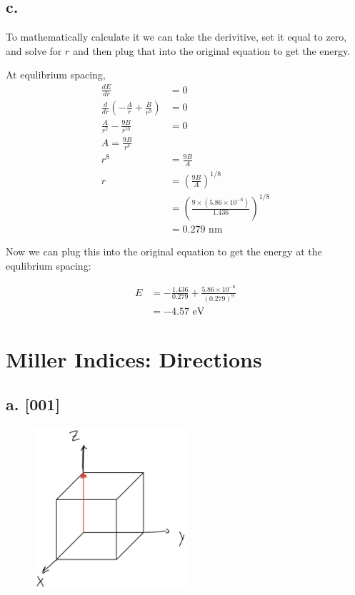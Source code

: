 \documentclass{article}
\begin{document}
\subsection*{c.}

To mathematically calculate it we can take the derivitive, set it equal to zero, and solve for $r$ and then plug that into the original equation to get the energy. 

At equlibrium spacing,
\begin{align*}
    \frac{dE}{dr} &= 0 \\
    \frac{d}{dr} \left( - 
    \frac{A}{r} + \frac{B}{r^9} \right) &= 0 \\
    \frac{A}{r^2} - \frac{9B}{r^{10}} &= 0 \\
    A = \frac{9B}{r^8} \\
    r^8 &= \frac{9B}{A} \\
    r &= \left( \frac{9B}{A} \right)^{1/8} \\
     &= \left( \frac{9 \times (5.86 \times 10^{-6})}{1.436} \right)^{1/8} \\
        &= 0.279 \text{ nm}
\end{align*}

Now we can plug this into the original equation to get the energy at the equlibrium spacing:

\begin{align*}
    E &= - \frac{1.436}{0.279} + \frac{5.86 \times 10^{-6}}{(0.279)^9} \\
    &= -4.57 \text{ eV}
\end{align*}

\section{Miller Indices: Directions}

\subsection*{a. [001]}

\begin{figure}[H]
    \centering
    \includegraphics[width=0.5\textwidth]{3a.png}
\end{figure}
\end{document}
